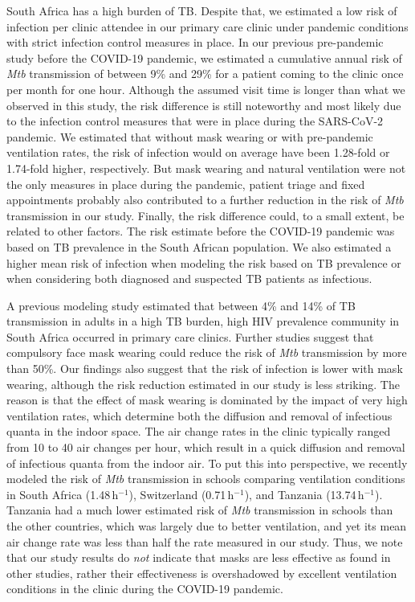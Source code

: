 \documentclass[fleqn,11pt]{wlscirep}
\begin{document}
South Africa has a high burden of TB\cite{WHO2022TBReport}. Despite that, we estimated a low risk of infection per clinic attendee in our primary care clinic under pandemic conditions with strict infection control measures in place. In our previous pre-pandemic study before the COVID-19 pandemic, we estimated a cumulative annual risk of \emph{Mtb} transmission of between 9\% and 29\% for a patient coming to the clinic once per month for one hour. Although the assumed visit time is longer than what we observed in this study, the risk difference is still noteworthy and most likely due to the infection control measures that were in place during the SARS-CoV-2 pandemic. We estimated that without mask wearing or with pre-pandemic ventilation rates, the risk of infection would on average have been 1.28-fold or 1.74-fold higher, respectively. But mask wearing and natural ventilation were not the only measures in place during the pandemic, patient triage and fixed appointments probably also contributed to a further reduction in the risk of \emph{Mtb} transmission in our study. Finally, the risk difference could, to a small extent, be related to other factors. The risk estimate before the COVID-19 pandemic was based on TB prevalence in the South African population. We also estimated a higher mean risk of infection when modeling the risk based on TB prevalence or when considering both diagnosed and suspected TB patients as infectious. 

A previous modeling study estimated that between 4\% and 14\% of TB transmission in adults in a high TB burden, high HIV prevalence community in South Africa occurred in primary care clinics\cite{McCreesh2022BMJGlobalHealth}. Further studies suggest that compulsory face mask wearing could reduce the risk of \emph{Mtb} transmission by more than 50\%\cite{Dharmadhikari2012AJRCCM,McCreesh2021BMJGlobalHealth}. Our findings also suggest that the risk of infection is lower with mask wearing, although the risk reduction estimated in our study is less striking. The reason is that the effect of mask wearing is dominated by the impact of very high ventilation rates, which determine both the diffusion and removal of infectious quanta in the indoor space. The air change rates in the clinic typically ranged from 10 to 40 air changes per hour, which result in a quick diffusion and removal of infectious quanta from the indoor air. To put this into perspective, we recently modeled the risk of \emph{Mtb} transmission in schools comparing ventilation conditions in South Africa (1.48\,h$^{-1}$), Switzerland (0.71\,h$^{-1}$), and Tanzania (13.74\,h$^{-1}$)\cite{Banholzer2024PGPH}. Tanzania had a much lower estimated risk of \emph{Mtb} transmission in schools than the other countries, which was largely due to better ventilation, and yet its mean air change rate was less than half the rate measured in our study. Thus, we note that our study results do \emph{not} indicate that masks are less effective as found in other studies, rather their effectiveness is overshadowed by excellent ventilation conditions in the clinic during the COVID-19 pandemic.
\end{document}
